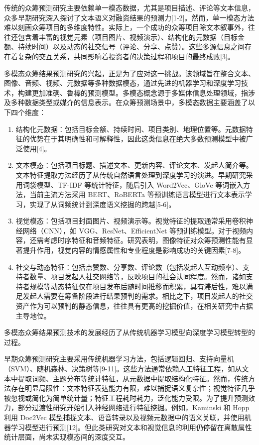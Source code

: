 传统的众筹预测研究主要依赖单一模态数据，尤其是项目描述、评论等文本信息，众多早期研究深入探讨了文本语义对融资结果的预测力[1-2]。然而，单一模态方法难以刻画众筹项目的多维度特性。实际上，一个成功的众筹项目除文本叙事外，往往还包含着丰富的视觉元素（项目图片、视频演示）、结构化的元数据（目标金额、持续时间）以及动态的社交信号（评论、分享、点赞）。这些多源信息之间存在着复杂的交互关系，共同影响着投资者的决策过程和项目的最终成败[3]。

多模态众筹结果预测研究的兴起，正是为了应对这一挑战。该领域旨在整合文本、图像、音频、视频、元数据等多种数据模态，通过先进的机器学习和深度学习技术，构建更加准确、鲁棒的预测模型。多模态概念源于多媒体信息处理领域，指涉及多种数据类型或媒介的信息表示。在众筹预测场景中，多模态数据主要涵盖了以下四个维度：

\begin{enumerate}[label=(\arabic*)]
  \item 结构化元数据：包括目标金额、持续时间、项目类别、地理位置等。元数据特征的优势在于其明确性和可解释性，因此这类信息在绝大多数预测模型中被广泛使用[4]。
  \item 文本模态：包括项目标题、描述文本、更新内容、评论文本、发起人简介等。文本特征提取方法经历了从传统自然语言处理到深度学习的演进。早期研究采用词袋模型、TF-IDF 等统计特征，随后引入 Word2Vec、GloVe 等词嵌入方法，当前主流方法采用 BERT、RoBERTa 等预训练语言模型进行文本表示学习，实现了从词频统计到深度语义挖掘的跨越[5-6]。
  \item 视觉模态：包括项目封面图片、视频演示等。视觉特征的提取通常采用卷积神经网络（CNN），如 VGG、ResNet、EfficientNet 等预训练模型。对于视频内容，还需考虑时序特征和音频特征。研究表明，图像特征对众筹预测性能有显著提升作用，视觉内容的情感属性和专业程度是影响成功的关键因素[7-8]。
  \item 社交与动态特征：包括点赞数、分享数、评论数（包括发起人互动频率）、支持者数量、项目发起人社交网络等，反映项目的社会认同程度。然而，诸如支持者规模等动态特征仅在项目发布后随时间推移而积累，具有滞后性，难以满足发起人需要在筹备阶段进行结果预判的需求。相比之下，项目发起人的社交资产作为可以预判的静态信息，往往具有更高的挖掘价值，在相关研究中占据主导地位。
\end{enumerate}

多模态众筹结果预测技术的发展经历了从传统机器学习模型向深度学习模型转型的过程。

早期众筹预测研究主要采用传统机器学习方法，包括逻辑回归、支持向量机（SVM）、随机森林、决策树等[9-11]。这些方法通常依赖人工特征工程，如从文本中提取词频、主题分布等统计特征，从元数据中提取结构化特征。然而，传统方法存在明显局限性：文本特征表达能力有限，难以捕捉语义复杂性；视觉特征几乎被忽视或简化为简单统计量；特征工程耗时耗力，泛化能力受限。为了提升预测效力，部分过渡性研究开始引入神经网络进行特征挖掘。例如，Kaminski 和 Hopp 利用 Doc2Vec 模型捕捉文本、语音转录以及视频元数据中的语义关联，并使用机器学习模型进行预测[12]。但此类研究对文本和视觉信息的利用仍停留在离散属性统计层面，尚未实现模态间的深度交互。

